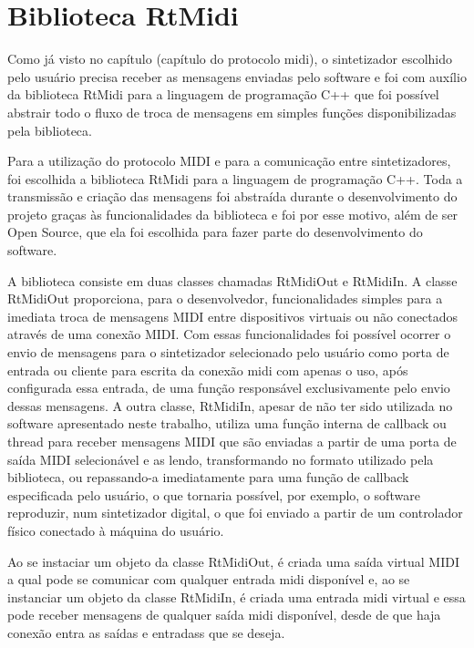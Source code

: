 \documentclass[12pt]{report}
\begin{document}
\appendix
\chapter{Biblioteca RtMidi}

Como já visto no capítulo (capítulo do protocolo midi), o sintetizador escolhido pelo usuário precisa receber as mensagens enviadas pelo software e foi com auxílio da biblioteca RtMidi para a linguagem de programação C++ que foi possível abstrair todo o fluxo de troca de mensagens em simples funções disponibilizadas pela biblioteca.

Para a utilização do protocolo MIDI e para a comunicação entre sintetizadores, foi escolhida a biblioteca RtMidi para a linguagem de programação C++. Toda a transmissão e criação das mensagens foi abstraída durante o desenvolvimento do projeto graças às funcionalidades da biblioteca e foi por esse motivo, além de ser Open Source, que ela foi escolhida para fazer parte do desenvolvimento do software.

A biblioteca consiste em duas classes chamadas RtMidiOut e RtMidiIn. A classe RtMidiOut proporciona, para o desenvolvedor, funcionalidades simples para a imediata troca de mensagens MIDI entre dispositivos virtuais ou não conectados através de uma conexão MIDI. Com essas funcionalidades foi possível ocorrer o envio de mensagens para o sintetizador selecionado pelo usuário como porta de entrada ou cliente para escrita da conexão midi com apenas o uso, após configurada essa entrada, de uma função responsável exclusivamente pelo envio dessas mensagens. A outra classe, RtMidiIn, apesar de não ter sido utilizada no software apresentado neste trabalho, utiliza uma função interna de callback ou thread para receber mensagens MIDI que são enviadas a partir de uma porta de saída MIDI selecionável e as lendo, transformando no formato utilizado pela biblioteca, ou repassando-a imediatamente para uma função de callback especificada pelo usuário, o que tornaria possível, por exemplo, o software reproduzir, num sintetizador digital, o que foi enviado a partir de um controlador físico conectado à máquina do usuário.

Ao se instaciar um objeto da classe RtMidiOut, é criada uma saída virtual MIDI a qual pode se comunicar com qualquer entrada midi disponível e, ao se instanciar um objeto da classe RtMidiIn, é criada uma entrada midi virtual e essa pode receber mensagens de qualquer saída midi disponível, desde de que haja conexão entra as saídas e entradass que se deseja.
\end{document}
